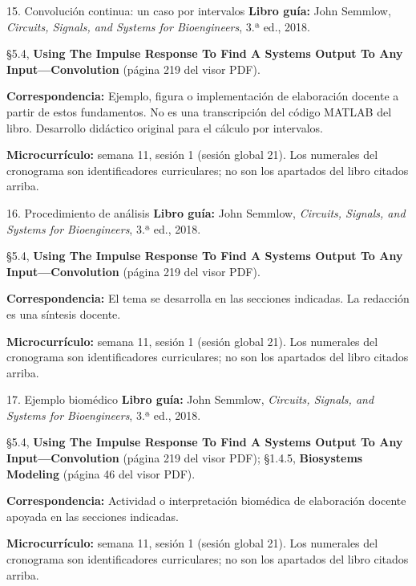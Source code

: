 \documentclass[
  10pt,
  ignorenonframetext,
  aspectratio=169,
  spanish,
]{beamer}
\begin{document}
\begin{frame}{15. Convolución continua: un caso por intervalos}
\label{convoluciuxf3n-continua-un-caso-por-intervalos}
\textbf{Libro guía:} John Semmlow, \emph{Circuits, Signals, and Systems
for Bioengineers}, 3.ª ed., 2018.

§5.4, \textbf{Using The Impulse Response To Find A Systems Output To Any
Input---Convolution} (página 219 del visor PDF).

\textbf{Correspondencia:} Ejemplo, figura o implementación de
elaboración docente a partir de estos fundamentos. No es una
transcripción del código MATLAB del libro. Desarrollo didáctico original
para el cálculo por intervalos.

\textbf{Microcurrículo:} semana 11, sesión 1 (sesión global 21). Los
numerales del cronograma son identificadores curriculares; no son los
apartados del libro citados arriba.
\end{frame}

\begin{frame}{16. Procedimiento de análisis}
\label{procedimiento-de-anuxe1lisis}
\textbf{Libro guía:} John Semmlow, \emph{Circuits, Signals, and Systems
for Bioengineers}, 3.ª ed., 2018.

§5.4, \textbf{Using The Impulse Response To Find A Systems Output To Any
Input---Convolution} (página 219 del visor PDF).

\textbf{Correspondencia:} El tema se desarrolla en las secciones
indicadas. La redacción es una síntesis docente.

\textbf{Microcurrículo:} semana 11, sesión 1 (sesión global 21). Los
numerales del cronograma son identificadores curriculares; no son los
apartados del libro citados arriba.
\end{frame}

\begin{frame}{17. Ejemplo biomédico}
\label{ejemplo-biomuxe9dico}
\textbf{Libro guía:} John Semmlow, \emph{Circuits, Signals, and Systems
for Bioengineers}, 3.ª ed., 2018.

§5.4, \textbf{Using The Impulse Response To Find A Systems Output To Any
Input---Convolution} (página 219 del visor PDF); §1.4.5,
\textbf{Biosystems Modeling} (página 46 del visor PDF).

\textbf{Correspondencia:} Actividad o interpretación biomédica de
elaboración docente apoyada en las secciones indicadas.

\textbf{Microcurrículo:} semana 11, sesión 1 (sesión global 21). Los
numerales del cronograma son identificadores curriculares; no son los
apartados del libro citados arriba.
\end{frame}
\end{document}

